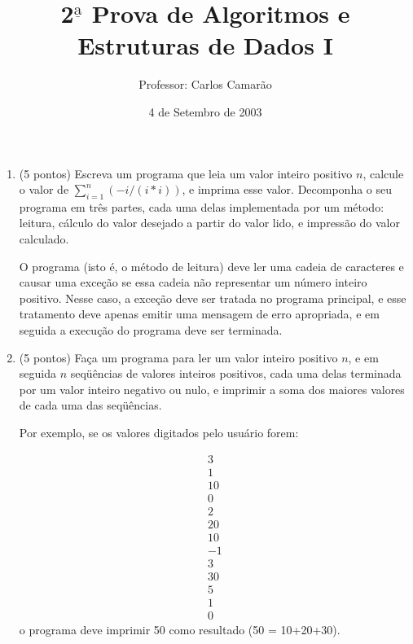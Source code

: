 
\title{2$^{\underline{\mbox{a}}}$ Prova de Algoritmos e Estruturas de Dados I}

\pagestyle{empty}	

\author{Professor: Carlos Camar\~ao}
\date{4 de Setembro de 2003}



\maketitle
\thispagestyle{empty}

\begin{enumerate}

\item (5 pontos) Escreva um programa que leia um valor inteiro
positivo $n$, calcule o valor de $\sum_{i=1}^n (-i/(i*i))$, e imprima
esse valor.  Decomponha o seu programa em tr\^es partes, cada uma
delas implementada por um m\'etodo: leitura, c\'alculo do valor
desejado a partir do valor lido, e impress\~ao do valor calculado.

O programa (isto \'e, o m\'etodo de leitura) deve ler uma cadeia de
caracteres e causar uma exce\c{c}\~ao se essa cadeia n\~ao representar
um n\'umero inteiro positivo. Nesse caso, a exce\c{c}\~ao deve ser
tratada no programa principal, e esse tratamento deve apenas emitir
uma mensagem de erro apropriada, e em seguida a execu\c{c}\~ao do
programa deve ser terminada.

\item (5 pontos) Fa\c{c}a um programa para ler um valor inteiro
positivo $n$, e em seguida $n$ seq\"u\^encias de valores inteiros
positivos, cada uma delas terminada por um valor inteiro negativo ou
nulo, e imprimir a soma dos maiores valores de cada uma das
seq\"u\^encias.

Por exemplo, se os valores digitados pelo usu\'ario forem:
  
  \[ \begin{array}{l}
        3    \\
        1    \\
        10   \\
        0    \\
        2    \\
        20   \\
        10   \\
        -1   \\
        3    \\ 
        30   \\
        5    \\
        1    \\
        0    
      \end{array} \]
o programa deve imprimir 50 como resultado (50 = 10+20+30).


\end{enumerate}

